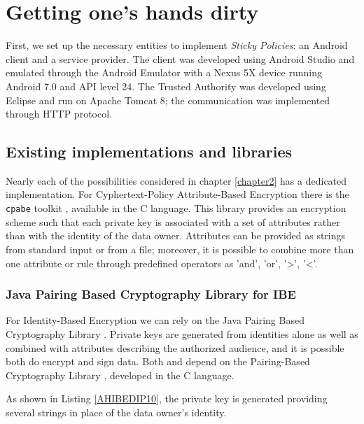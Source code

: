 \chapter{Getting one's hands dirty}
\label{chapter3}
\thispagestyle{empty}

\noindent First, we set up the necessary entities to implement \textit{Sticky Policies}: an Android client and a service provider. The client was developed using Android Studio and emulated through the Android Emulator with a Nexus 5X device running Android 7.0 and API level 24. The Trusted Authority was developed using Eclipse and run on Apache Tomcat 8; the communication was implemented through HTTP protocol.

\section{Existing implementations and libraries}
Nearly each of the possibilities considered in chapter \ref{chapter2} has a dedicated implementation. For Cyphertext-Policy Attribute-Based Encryption there is the \texttt{cpabe} toolkit \cite{bethencourt2011library}, available in the C language. This library provides an encryption scheme such that each private key is associated with a set of attributes rather than with the identity of the data owner. Attributes can be provided as strings from standard input or from a file; moreover, it is possible to combine more than one attribute or rule through predefined operators as 'and', 'or', '>', '<'.

\subsection{Java Pairing Based Cryptography Library for IBE}
For Identity-Based Encryption we can rely on the Java Pairing Based Cryptography Library \cite{ISCC:DecIov11}. Private keys are generated from identities alone as well as combined with attributes describing the authorized audience, and it is possible both do encrypt and sign data. Both \cite{ISCC:DecIov11} and \cite{bethencourt2011library} depend on the Pairing-Based Cryptography Library \cite{PBC2007Lynn}, developed in the C language.



As shown in Listing \ref{AHIBEDIP10}, the private key is generated providing several strings in place of the data owner's identity.

